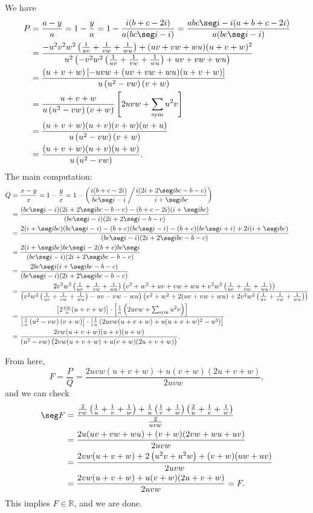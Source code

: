 We have
\begin{align*}
    P&=\frac{a-y}a=1-\frac ya
    =1-\frac{i(b+c-2i)}{a(bc\seg i-i)}=\frac{abc\seg i-i(a+b+c-2i)}{a(bc\seg i-i)}\\
    &=\frac{-u^2v^2w^2\left(\frac1{uv}+\frac1{vw}+\frac1{wu}\right)+(uv+vw+wu)(u+v+w)^2}{u^2\left(-v^2w^2\left(\frac1{uv}+\frac1{vw}+\frac1{wu}\right)+uv+vw+wu\right)}\\
    &=\frac{(u+v+w)\left[-uvw+(uv+vw+wu)(u+v+w)\right]}{u\left(u^2-vw\right)(v+w)}\\
    &=\frac{u+v+w}{u\left(u^2-vw\right)(v+w)}\left[2uvw+\sum_\mathrm{sym}u^2v\right]\\
    &=\frac{(u+v+w)(u+v)(v+w)(w+u)}{u\left(u^2-vw\right)(v+w)}\\
    &=\frac{(u+v+w)(u+v)(u+w)}{u\left(u^2-vw\right)}.
\end{align*}
The main computation:
\begin{align*}
    Q&=\frac{x-y}x=1-\frac yx=1-\left(\frac{i(b+c-2i)}{bc\seg i-i}\bigg/\frac{i(2i+2\seg ibc-b-c)}{i+\seg ibc}\right)\\
    &=\frac{(bc\seg i-i)(2i+2\seg ibc-b-c)-(b+c-2i)(i+\seg ibc)}{(bc\seg i-i)(2i+2\seg i-b-c)}\\
    &=\frac{2(i+\seg ibc)(bc\seg i-i)-(b+c)(bc\seg i-i)-(b+c)(bc\seg i+i)+2i(i+\seg ibc)}{(bc\seg i-i)(2i+2\seg ibc-b-c)}\\
    &=\frac{2(i+\seg ibc)bc\seg i-2(b+c)bc\seg i}{(bc\seg i-i)(2i+2\seg ibc-b-c)}\\
    &=\frac{2bc\seg i(i+\seg ibc-b-c)}{(bc\seg i-i)(2i+2\seg ibc-b-c)}\\
    &=\frac{2v^2w^2\left(\frac1{uv}+\frac1{vw}+\frac1{wu}\right)\left(v^2+w^2+uv+vw+wu+v^2w^2\left(\frac1{uv}+\frac1{vw}+\frac1{wu}\right)\right)}{\left(v^2w^2\left(\frac1{uv}+\frac1{vw}+\frac1{wu}\right)-uv-vw-wu\right)\left(v^2+w^2+2(uv+vw+wu)+2v^2w^2\left(\frac1{uv}+\frac1{vw}+\frac1{wu}\right)\right)}\\
    &=\frac{\left[2\frac{vw}u(u+v+w)\right]\cdot\left[\frac1u\left(2uvw+\sum_\mathrm{sym}u^2v\right)\right]}{\left[\frac1u\left(u^2-vw\right)(v+w)\right]\cdot\left[\frac1u\left(2uvw(u+v+w)+u(u+v+w)^2-u^3\right)\right]}\\
    &=\frac{2vw(u+v+w)(u+v)(u+w)}{\left(u^2-vw\right)\big(2vw(u+v+w)+u(v+w)(2u+v+w)\big)}.
\end{align*}

From here, \[F=\frac PQ=\frac{2uvw(u+v+w)+u(v+w)(2u+v+w)}{2uvw},\]
and we can check
\begin{align*}
    \seg F&=\frac{\frac2{vw}\left(\frac1u+\frac1v+\frac1w\right)+\frac1u\left(\frac1v+\frac1w\right)\left(\frac2u+\frac1v+\frac1w\right)}{\frac2{uvw}}\\
    &=\frac{2u(uv+vw+wu)+(v+w)(2vw+wu+uv)}{2uvw}\\
    &=\frac{2vw(u+v+w)+2\left(u^2v+u^2w\right)+(v+w)(uw+uv)}{2uvw}\\
    &=\frac{2vw(u+v+w)+u(v+w)(2u+v+w)}{2uvw}=F.
\end{align*}
This implies $F\in\mathbb R$, and we are done.


